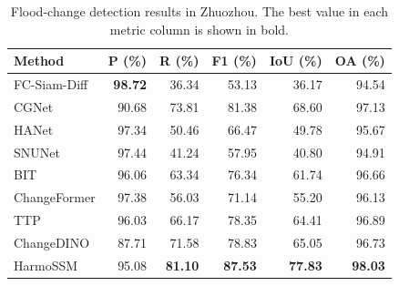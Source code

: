 \begingroup
\begin{table}[H]
\centering
\comparisonfont
\captionsetup{name=Table,font=comparisoncaption,labelfont=bf,labelsep=newline,justification=raggedright,singlelinecheck=false}
\caption{Flood-change detection results in Zhuozhou. The best value in each metric column is shown in bold.}
\label{tab:comparison_zhuozhou}
\fontsize{10}{12}\selectfont
\setlength{\tabcolsep}{6pt}
\renewcommand{\arraystretch}{1.15}
\begin{tabular*}{\linewidth}{@{\extracolsep{\fill}}lrrrrr@{}}
\toprule
Method & P (\%) & R (\%) & F1 (\%) & IoU (\%) & OA (\%) \\
\midrule
FC-Siam-Diff & \textbf{98.72} & 36.34 & 53.13 & 36.17 & 94.54 \\
CGNet & 90.68 & 73.81 & 81.38 & 68.60 & 97.13 \\
HANet & 97.34 & 50.46 & 66.47 & 49.78 & 95.67 \\
SNUNet & 97.44 & 41.24 & 57.95 & 40.80 & 94.91 \\
BIT & 96.06 & 63.34 & 76.34 & 61.74 & 96.66 \\
ChangeFormer & 97.38 & 56.03 & 71.14 & 55.20 & 96.13 \\
TTP & 96.03 & 66.17 & 78.35 & 64.41 & 96.89 \\
ChangeDINO & 87.71 & 71.58 & 78.83 & 65.05 & 96.73 \\
HarmoSSM & 95.08 & \textbf{81.10} & \textbf{87.53} & \textbf{77.83} & \textbf{98.03} \\
\bottomrule
\end{tabular*}
\end{table}
\endgroup

